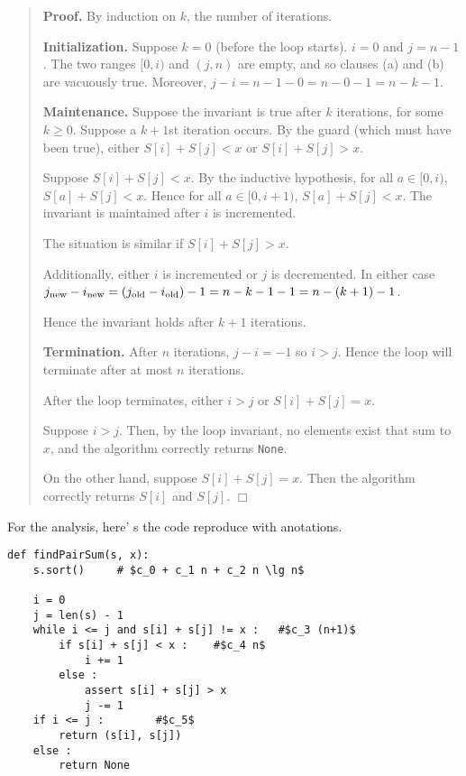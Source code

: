 \documentclass{article}
\newcommand\old{_{\mbox{\scriptsize old}}}
\newcommand\nw{_{\mbox{\scriptsize new}}}
\begin{document}
\begin{quote}
\textbf{Proof.}
By induction on $k$, the number of iterations.

\textbf{Initialization.}
Suppose $k = 0$ (before the loop starts).
$i = 0$ and $j = n-1$.
The two ranges $[0, i)$ and $(j, n)$ are empty, and so 
clauses (a) and (b) are vacuously true.
Moreover, $j - i = n - 1 - 0 = n - 0 - 1 = n - k - 1$.

\textbf{Maintenance.}
Suppose the invariant is true after $k$ iterations, for
some $k \geq 0$.
Suppose a $k + 1$st iteration occurs.
By the guard (which must have been true),
either $S[i] + S[j] < x$ or $S[i] + S[j] > x$.

Suppose $S[i] + S[j] < x$.
By the inductive hypothesis, for all $a \in [0, i)$,
$S[a] + S[j] < x$.
Hence for all $a \in [0, i+1)$, $S[a] + S[j] < x$.
The invariant is maintained after $i$ is incremented.

The situation is similar if $S[i] + S[j] > x$.

Additionally, either $i$ is incremented or $j$ is decremented.
In either case $j\nw - i\nw = (j\old - i\old) - 1 = n - k - 1 - 1 = 
n - (k+1) - 1$.

Hence the invariant holds after $k + 1$ iterations.

\textbf{Termination.}
After $n$ iterations, $j - i = -1$ so $i > j$.
Hence the loop will terminate after at most $n$ iterations.

After the loop terminates, either $i > j$ or $S[i] + S[j] = x$.

Suppose $i > j$. 
Then, by the loop invariant, no elements exist that sum to $x$,
and the algorithm correctly returns \texttt{None}.

On the other hand, suppose $S[i] + S[j] = x$.
Then the algorithm correctly returns $S[i]$ and $S[j]$.
$\Box$
\end{quote}

\noindent
For the analysis, here' s the code reproduce with anotations.

\begin{verbatim}
def findPairSum(s, x):
    s.sort()     # $c_0 + c_1 n + c_2 n \lg n$

    i = 0
    j = len(s) - 1
    while i <= j and s[i] + s[j] != x :   #$c_3 (n+1)$
        if s[i] + s[j] < x :    #$c_4 n$
            i += 1
        else :
            assert s[i] + s[j] > x
            j -= 1
    if i <= j :        #$c_5$
        return (s[i], s[j])
    else :
        return None
\end{verbatim}
\end{document}
